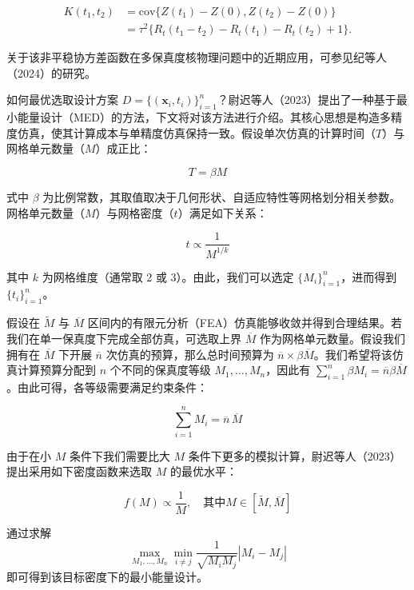 \documentclass{ctexart}
\begin{document}
\begin{align*}
K(t_1,t_2)&=\mathrm{cov}\{Z(t_1)-Z(0),Z(t_2)-Z(0)\}\\
&=\tau^2\{R_t(t_1-t_2)-R_t(t_1)-R_t(t_2)+1\}.
\tag{4.61}
\end{align*}

关于该非平稳协方差函数在多保真度核物理问题中的近期应用，可参见纪等人（2024）的研究。

如何最优选取设计方案 $D=\{(\boldsymbol{x}_i,t_i)\}_{i=1}^n$？尉迟等人（2023）提出了一种基于最小能量设计（MED）的方法，下文将对该方法进行介绍。其核心思想是构造多精度仿真，使其计算成本与单精度仿真保持一致。假设单次仿真的计算时间（$T$）与网格单元数量（$M$）成正比：

\begin{equation*}
T=\beta M
\tag{4.62}
\end{equation*}

式中 $\beta$ 为比例常数，其取值取决于几何形状、自适应特性等网格划分相关参数。网格单元数量（$M$）与网格密度（$t$）满足如下关系：

\begin{equation*}
t\propto\frac{1}{M^{1/k}}
\tag{4.63}
\end{equation*}

其中 $k$ 为网格维度（通常取 2 或 3）。由此，我们可以选定 $\{M_i\}_{i=1}^n$，进而得到 $\{t_i\}_{i=1}^n$。

假设在 $\widetilde{M}$ 与 $\overline{M}$ 区间内的有限元分析（FEA）仿真能够收敛并得到合理结果。若我们在单一保真度下完成全部仿真，可选取上界 $\overline{M}$ 作为网格单元数量。假设我们拥有在 $\overline{M}$ 下开展 $\overline{n}$ 次仿真的预算，那么总时间预算为 $\overline{n}\times\beta\overline{M}$。我们希望将该仿真计算预算分配到 $n$ 个不同的保真度等级 $M_1,\dots,M_n$，因此有 $\sum_{i=1}^n\beta M_i=\overline{n}\beta\overline{M}$。由此可得，各等级需要满足约束条件：

\begin{equation*}
\sum_{i=1}^nM_i=\overline{n}\,\overline{M}
\tag{4.64}
\end{equation*}

由于在小 $M$ 条件下我们需要比大 $M$ 条件下更多的模拟计算，尉迟等人（2023）提出采用如下密度函数来选取 $M$ 的最优水平：

\begin{equation*}
f(M)\propto\frac{1}{M},\quad\text{其中}M\in[\widetilde{M},\overline{M}]
\end{equation*}

通过求解
\begin{equation*}
\max_{M_1,\dots,M_n}\min_{i\neq j}\frac{1}{\sqrt{M_iM_j}}\left|M_i-M_j\right|
\tag{4.65}
\end{equation*}
即可得到该目标密度下的最小能量设计。
\end{document}
